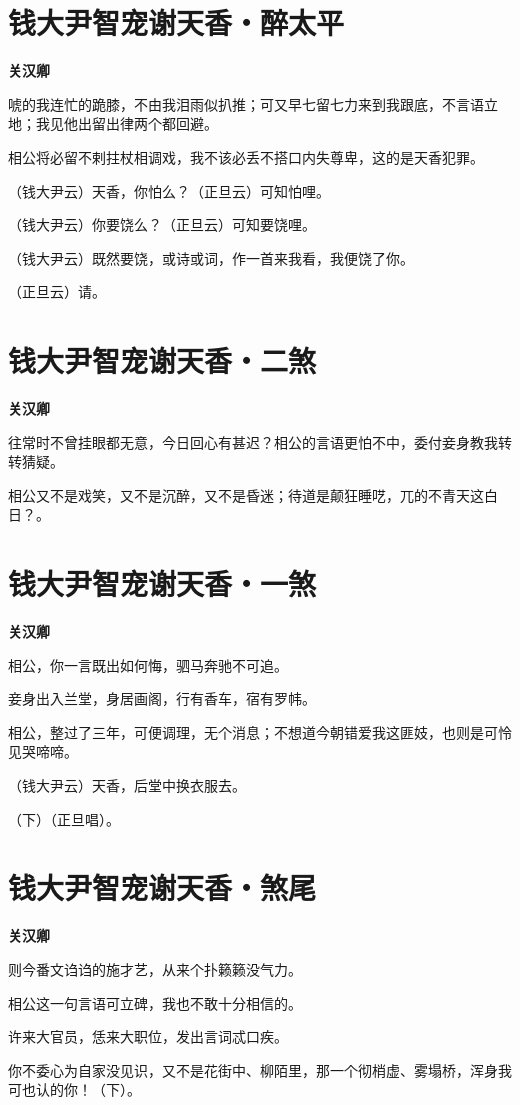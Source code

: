 \documentclass[12pt,a4paper]{ctexbook}
\begin{document}
\section{钱大尹智宠谢天香・醉太平}
\textbf{关汉卿}\par\vspace{0.5em}
唬的我连忙的跪膝，不由我泪雨似扒推；可又早七留七力来到我跟底，不言语立地；我见他出留出律两个都回避。\par
相公将必留不剌拄杖相调戏，我不该必丢不搭口内失尊卑，这的是天香犯罪。\par
（钱大尹云）天香，你怕么？（正旦云）可知怕哩。\par
（钱大尹云）你要饶么？（正旦云）可知要饶哩。\par
（钱大尹云）既然要饶，或诗或词，作一首来我看，我便饶了你。\par
（正旦云）请。\par

\section{钱大尹智宠谢天香・二煞}
\textbf{关汉卿}\par\vspace{0.5em}
往常时不曾挂眼都无意，今日回心有甚迟？相公的言语更怕不中，委付妾身教我转转猜疑。\par
相公又不是戏笑，又不是沉醉，又不是昏迷；待道是颠狂睡呓，兀的不青天这白日？。\par

\section{钱大尹智宠谢天香・一煞}
\textbf{关汉卿}\par\vspace{0.5em}
相公，你一言既出如何悔，驷马奔驰不可追。\par
妾身出入兰堂，身居画阁，行有香车，宿有罗帏。\par
相公，整过了三年，可便调理，无个消息；不想道今朝错爱我这匪妓，也则是可怜见哭啼啼。\par
（钱大尹云）天香，后堂中换衣服去。\par
（下）（正旦唱）。\par

\section{钱大尹智宠谢天香・煞尾}
\textbf{关汉卿}\par\vspace{0.5em}
则今番文诌诌的施才艺，从来个扑籁籁没气力。\par
相公这一句言语可立碑，我也不敢十分相信的。\par
许来大官员，恁来大职位，发出言词忒口疾。\par
你不委心为自家没见识，又不是花街中、柳陌里，那一个彻梢虚、雾塌桥，浑身我可也认的你！（下）。\par
\end{document}
